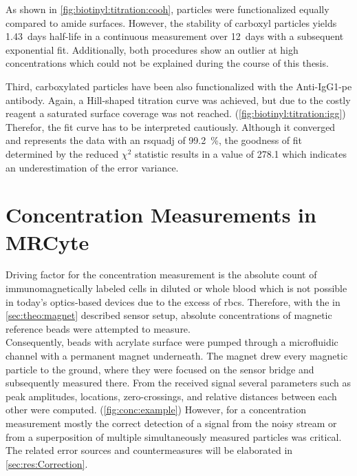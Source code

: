 As shown in \cref{fig:biotinyl:titration:cooh}, particles were functionalized equally compared to \gls{amide} surfaces. However, the stability of \gls{carboxyl} particles yields \SI{1.43}{days} half-life in a continuous measurement over \SI{12}{days} with a subsequent exponential fit. Additionally, both procedures show an outlier at high concentrations which could not be explained during the course of this thesis. 

Third, \gls{carboxyl}ated particles have been also functionalized with the Anti-IgG1-\gls{pe} antibody. Again, a Hill-shaped titration curve was achieved, but due to the costly reagent a saturated surface coverage was not reached. (\cref{fig:biotinyl:titration:igg}) \\
Therefor, the fit curve has to be interpreted cautiously. Although it converged and represents the data with an \gls{rsquadj} of \SI{99.2}{\percent}, the goodness of fit determined by the reduced $\chi^2$ statistic results in a value of \num{278.1} which indicates an underestimation of the error variance.

\clearpage
\section{Concentration Measurements in MRCyte}
Driving factor for the concentration measurement is the absolute count of immunomagnetically labeled cells in diluted or whole blood which is not possible in today's optics-based devices due to the excess of \glspl{rbc}.\cite{lit:bio:Alberts} Therefore, with the in \cref{sec:theo:magnet} described sensor setup, absolute concentrations of magnetic reference beads were attempted to measure.\\
Consequently, beads with acrylate surface were pumped through a microfluidic channel with a permanent magnet underneath. The magnet drew every magnetic particle to the ground, where they were focused on the sensor bridge and subsequently measured there. From the received signal several parameters such as peak amplitudes, locations, zero-crossings, and relative distances between each other were computed. (\cref{fig:conc:example}) However, for a concentration measurement mostly the correct detection of a signal from the noisy stream or from a superposition of multiple simultaneously measured particles was critical. The related error sources and countermeasures will be elaborated in \cref{sec:res:Correction}.

